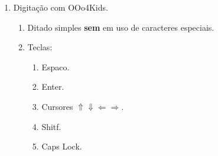 \begin{enumerate}
	\item Digitação com OOo4Kids.
	\begin{enumerate}
		\item Ditado simples \textbf{sem} em uso de caracteres especiais.
		\item Teclas:
		\begin{enumerate}
			\item Espaco.
			\item Enter.
			\item Cursores \textbf{$\Uparrow\Downarrow\Leftarrow\Rightarrow$}.
			\item Shitf.
			\item Caps Lock.
		\end{enumerate}
	\end{enumerate}
\end{enumerate}

